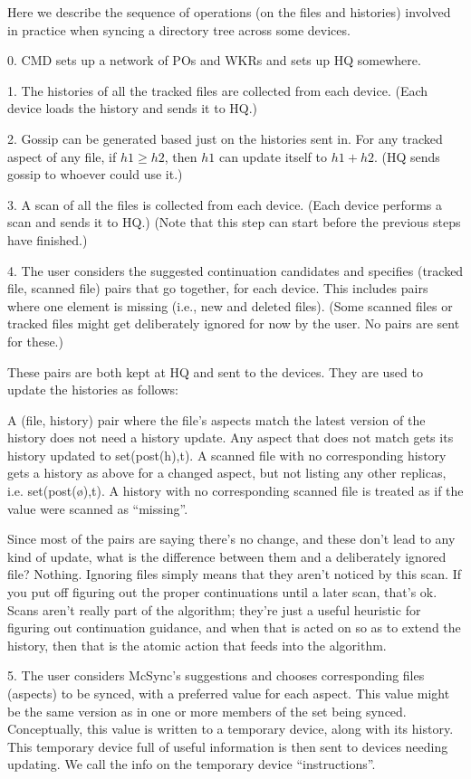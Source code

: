 \documentclass{book}
\begin{document}
Here we describe the sequence of operations (on the files and histories) involved in practice when syncing a directory tree across some devices.

0.
CMD sets up a network of POs and WKRs and sets up HQ somewhere.

1.
The histories of all the tracked files are collected from each device.  (Each device loads the history and sends it to HQ.)

2.
Gossip can be generated based just on the histories sent in.  For any tracked aspect of any file, if $h1 ≥ h2$, then $h1$ can update itself to $h1 + h2$.  (HQ sends gossip to whoever could use it.)

3.
A scan of all the files is collected from each device.  (Each device performs a scan and sends it to HQ.)
(Note that this step can start before the previous steps have finished.)

4.
The user considers the suggested continuation candidates and specifies (tracked file, scanned file) pairs that go together, for each device.  This includes pairs where one element is missing (i.e., new and deleted files).  (Some scanned files or tracked files might get deliberately ignored for now by the user.  No pairs are sent for these.)

These pairs are both kept at HQ and sent to the devices.  They are used to update the histories as follows:

A (file, history) pair where the file's aspects match the latest version of the history does not need a history update.  Any aspect that does not match gets its history updated to set(post(h),t).  A scanned file with no corresponding history gets a history as above for a changed aspect, but not listing any other replicas, i.e. set(post(ø),t).  A history with no corresponding scanned file is treated as if the value were scanned as ``missing''.

Since most of the pairs are saying there's no change, and these don't lead to any kind of update, what is the difference between them and a deliberately ignored file?  Nothing.  Ignoring files simply means that they aren't noticed by this scan.  If you put off figuring out the proper continuations until a later scan, that's ok.  Scans aren't really part of the algorithm; they're just a useful heuristic for figuring out continuation guidance, and when that is acted on so as to extend the history, then that is the atomic action that feeds into the algorithm.

5.
The user considers McSync's suggestions and chooses corresponding files (aspects) to be synced, with a preferred value for each aspect.  This value might be the same version as in one or more members of the set being synced.  Conceptually, this value is written to a temporary device, along with its history.  This temporary device full of useful information is then sent to devices needing updating.  We call the info on the temporary device ``instructions''.
\end{document}
